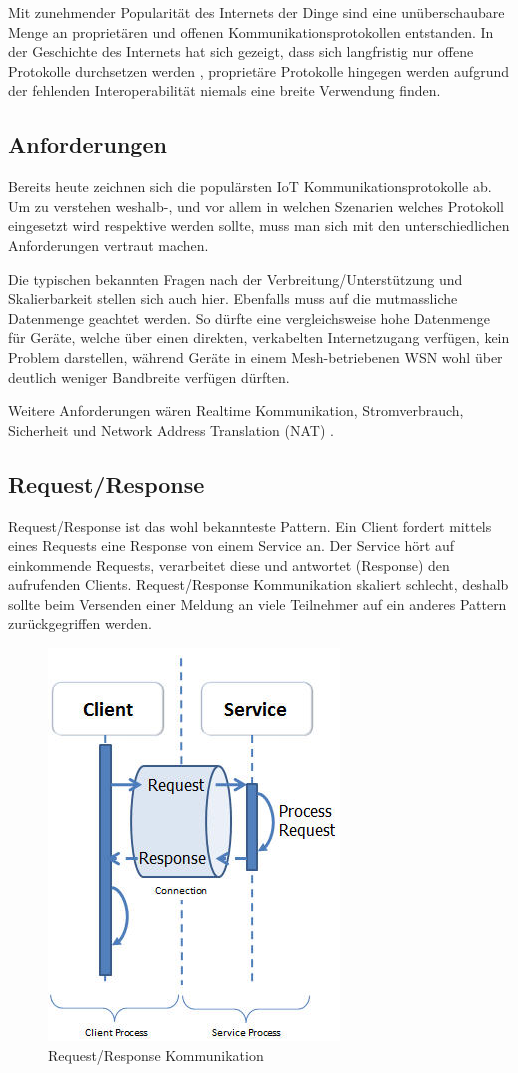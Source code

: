 Mit zunehmender Popularität des Internets der Dinge sind eine unüberschaubare Menge an proprietären und offenen Kommunikationsprotokollen entstanden. In der Geschichte des Internets hat sich gezeigt, dass sich langfristig nur offene Protokolle durchsetzen werden \cite{Obermaier14}, proprietäre Protokolle hingegen werden aufgrund der fehlenden Interoperabilität niemals eine breite Verwendung finden.
\subsection{Anforderungen}
Bereits heute zeichnen sich die populärsten IoT Kommunikationsprotokolle ab. Um zu verstehen weshalb-, und vor allem in welchen Szenarien welches Protokoll eingesetzt wird respektive werden sollte, muss man sich mit den unterschiedlichen Anforderungen vertraut machen.

Die typischen bekannten Fragen nach der Verbreitung/Unterstützung und Skalierbarkeit stellen sich auch hier. Ebenfalls muss auf die mutmassliche Datenmenge geachtet werden. So dürfte eine vergleichsweise hohe Datenmenge für Geräte, welche über einen direkten, verkabelten Internetzugang verfügen, kein Problem darstellen, während Geräte in einem Mesh-betriebenen WSN wohl über deutlich weniger Bandbreite verfügen dürften.

Weitere Anforderungen wären Realtime Kommunikation, Stromverbrauch, Sicherheit und Network Address Translation (NAT) \cite{Obermaier15}.
\subsection{Request/Response}
Request/Response ist das wohl bekannteste Pattern. Ein Client fordert mittels eines Requests eine Response von einem Service an. Der Service hört auf einkommende Requests, verarbeitet diese und antwortet (Response) den aufrufenden Clients. Request/Response Kommunikation skaliert schlecht, deshalb sollte beim Versenden einer Meldung an viele Teilnehmer auf ein anderes Pattern zurückgegriffen werden. 
\begin{figure}[H]
\centering
\includegraphics[scale=0.8]{images/request-response.png}
\caption{Request/Response Kommunikation \cite{ReqRes}}
\end{figure}
